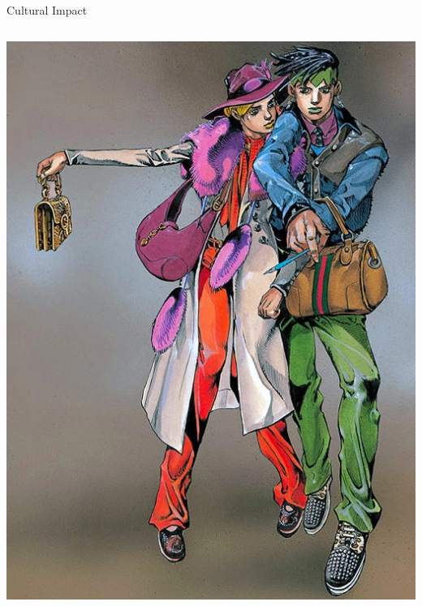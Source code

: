 \documentclass[presentation]{beamer}
\begin{document}
\begin{frame}{Cultural Impact}
\begin{columns}[T]
\begin{column}{0.55\textwidth}
{				\hspace{0.6em}\includegraphics[height=0.38\textheight,width=\linewidth,keepaspectratio]{Gucci_X_Araki_X_Spur.jpg}
				\vspace{0.4em} 
			}
			
		\end{column}
		
	\end{columns}
\end{frame}
\end{document}

